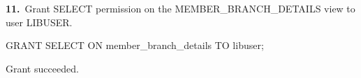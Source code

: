\noindent\begin{minipage}{\linewidth}
\begingroup{}
{\fontsize{14}{17}\selectfont\textbf{11.}}\ Grant SELECT permission on the MEMBER\_BRANCH\_DETAILS view to user LIBUSER.\par
\endgroup\vspace{12pt}


\begin{sqlcode}
GRANT SELECT ON member_branch_details TO libuser;
\end{sqlcode}

\vspace{18pt}


\begin{sqlout}[fontsize=\small]
Grant succeeded.
\end{sqlout}
\end{minipage}\par\vspace{24pt}

